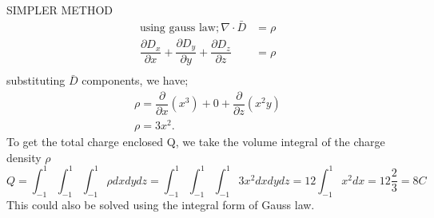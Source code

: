 \begin{exmp}
	
	SIMPLER METHOD	 
	\begin{align*}
			\text{using gauss law}; \nabla\cdot\bar{D}&=\rho\\
			\dfrac{\partial D_{x}}{\partial x}+\dfrac{\partial D_{y}}{\partial y}+\dfrac{\partial 
					D_{z}}{\partial z}&=\rho \\
		\end{align*}
	substituting $\bar{D}$ components, we have;
	\begin{align*}
			\rho= \dfrac{\partial}{\partial x}(x^{3})+ 0 +\dfrac{\partial }{\partial z}(x^{2}y)\\
			\rho=3x^{2} .
		\end{align*}
	To get the total charge enclosed Q, we take the volume integral of the charge density $\rho$
	\begin{dmath*}
			Q=\int_{-1}^{1}\int_{-1}^{1}\int_{-1}^{1}\rho dxdydz
			=\int_{-1}^{1}\int_{-1}^{1}\int_{-1}^{1}3x^{2}dxdydz
			=12\int_{-1}^{1}x^{2}dx= 12\frac{2}{3}
			= 8 C
		\end{dmath*}
	This could also be solved using the integral form of Gauss law.
\end{exmp}

